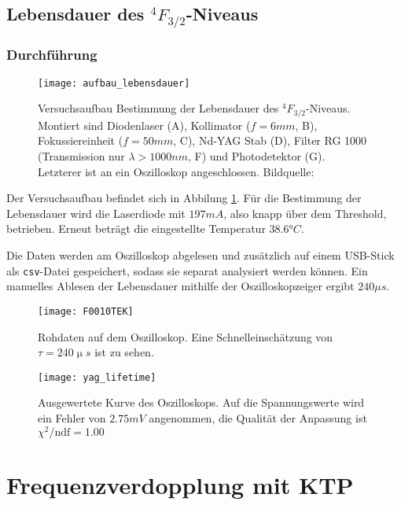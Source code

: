 \documentclass{../Misc/MontavonLaTeX/Montavon}
\newcommand{\halfwidth}{0.48\textwidth}
\newcommand{\fullwidth}{1.0\textwidth}
\begin{document}
\subsection{Lebensdauer des $^4F_{3/2}$-Niveaus}
\subsubsection{Durchführung}
\begin{figure}[htbp]
\centering
\texttt{[image: aufbau\_lebensdauer]}
\caption{Versuchsaufbau Bestimmung der Lebensdauer des $^4F_{3/2}$-Niveaus. Montiert sind Diodenlaser (A), Kollimator ($f = 6 \unit{mm}$, B), Fokussiereinheit ($f = 50 \unit{mm}$, C), Nd-YAG Stab (D), Filter RG 1000 (Transmission nur $\lambda > 1000 \unit{nm}$, F) und Photodetektor (G). Letzterer ist an ein Oszilloskop angeschlossen. Bildquelle: \cite[S. 35]{anleitung1}}
\label{fig:aufbau_lebensdauer}
\end{figure}

Der Versuchsaufbau befindet sich in Abbilung \ref{fig:aufbau_lebensdauer}. Für die Bestimmung der Lebensdauer wird die Laserdiode mit $197 \unit{mA}$, also knapp über dem Threshold, betrieben. Erneut beträgt die eingestellte Temperatur $38.6 \unit{\degree C}$.

Die Daten werden am Oszilloskop abgelesen und zusätzlich auf einem USB-Stick als \texttt{csv}-Datei gespeichert, sodass sie separat analysiert werden können. Ein manuelles Ablesen der Lebensdauer mithilfe der Oszilloskopzeiger ergibt $240 \unit{\mu s}$. 

\begin{figure}[htpb]
\centering
\texttt{[image: F0010TEK]}
\caption{Rohdaten auf dem Oszilloskop. Eine Schnelleinschätzung von $\tau = 240 \unit{\upmu s}$ ist zu sehen.}
\label{fig:lebensdauer_oszi}
\end{figure}

\begin{figure}[htpb]
\centering
\texttt{[image: yag\_lifetime]}
\caption{Ausgewertete Kurve des Oszilloskops. Auf die Spannungswerte wird ein Fehler von $2.75 \unit{mV}$ angenommen, die Qualität der Anpassung ist $\chi^2 / \textrm{ndf} = 1.00$}
\label{fig:lebensdauer_fit}
\end{figure}


\section{Frequenzverdopplung mit KTP}
\end{document}
